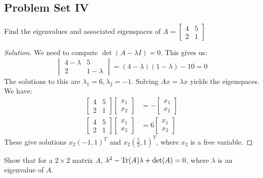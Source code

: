 \documentclass[../main.tex]{subfiles}
\begin{document}
\subsection{Problem Set IV}
%
\begin{problem}
Find the eigenvalues and associated eigenspaces of $A = \begin{bmatrix}4 & 5 \\ 2 & 1 \end{bmatrix}$
\end{problem}
\begin{proof}[Solution]
We need to compute $\det(A-\lambda I)=0$. This gives us:
%
\begin{equation*}
    \begin{vmatrix} 4-\lambda & 5 \\ 2 & 1-\lambda \end{vmatrix} = (4-\lambda)(1-\lambda)-10 = 0
\end{equation*}
The solutions to this are $\lambda_1 = 6, \lambda_2 = -1$. Solving $Ax = \lambda x$ yields the eigenspaces. We have:
\begin{align*}
    \begin{bmatrix} 4 & 5 \\ 2 & 1 \end{bmatrix} \begin{bmatrix} x_1 \\ x_2 \end{bmatrix} &= -\begin{bmatrix} x_1 \\ x_2 \end{bmatrix}\\
    \begin{bmatrix} 4 & 5 \\ 2 & 1 \end{bmatrix} \begin{bmatrix} x_1 \\ x_2 \end{bmatrix} &= 6\begin{bmatrix} x_1 \\ x_2 \end{bmatrix}
\end{align*}
These give solutions $x_2(-1,1)^T$ and $x_2 (\frac{5}{2},1)^T$, where $x_2$ is a free variable.
\end{proof}
%
\begin{problem}
Show that for a $2\times 2$ matrix $A$, $\lambda^2 - \Tr(A)\lambda + \det(A) = 0$, where $\lambda$ is an eigenvalue of $A$.
\end{problem}
\end{document}
